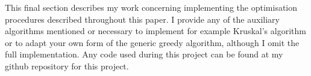 \documentclass[../main.tex]{subfiles}
\begin{document}
This final section describes my work concerning implementing the optimisation procedures described throughout this paper. I provide any of the auxiliary algorithms mentioned or necessary to implement for example Kruskal's algorithm or to adapt your own form of the generic greedy algorithm, although I omit the full implementation.  Any code used during this project can be found at my github repository for this project\cite{github}.
\end{document}
